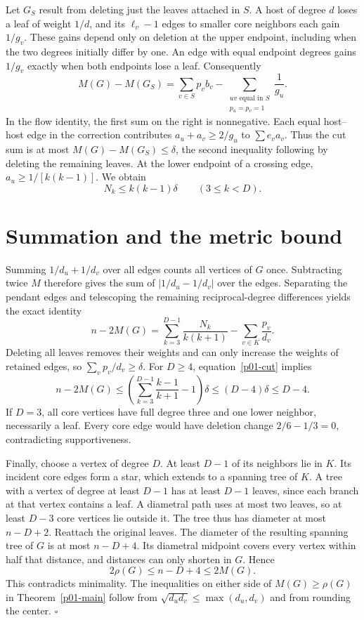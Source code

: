 \documentclass[11pt,a4paper]{article}
\begin{document}
Let $G_S$ result from deleting just the leaves attached in $S$.
A host of degree $d$ loses a leaf of weight $1/d$, and its
$\ell_v-1$ edges to smaller core neighbors each gain $1/g_v$.
These gains depend only on deletion at the upper endpoint, including
when the two degrees initially differ by one. An edge with equal
endpoint degrees gains $1/g_v$ exactly when both endpoints lose a leaf.
Consequently
\[
 M(G)-M(G_S)=\sum_{v\in S}p_v b_v-
 \sum_{\substack{uv\text{ equal in }S\\p_u=p_v=1}}\frac1{g_u}.
\]
In the flow identity, the first sum on the right is nonnegative. Each
equal host--host edge in the correction contributes $a_u+a_v\ge2/g_u$
to $\sum e_v a_v$. Thus the cut sum is at most $M(G)-M(G_S)\le\delta$,
the second inequality following by deleting the remaining leaves.
At the lower endpoint of a crossing edge, $a_u\ge1/[k(k-1)]$. We obtain
\begin{equation}\label{p01-cut}
 \boxed{N_k\le k(k-1)\delta\qquad(3\le k<D).}
\end{equation}

\section{Summation and the metric bound}
Summing $1/d_u+1/d_v$ over all edges counts all vertices of $G$ once.
Subtracting twice $M$ therefore gives the sum of $|1/d_u-1/d_v|$ over
the edges. Separating the pendant edges and telescoping the remaining
reciprocal-degree differences yields the exact identity
\[
 n-2M(G)=\sum_{k=3}^{D-1}\frac{N_k}{k(k+1)}
               -\sum_{v\in K}\frac{p_v}{d_v}.
\]
Deleting all leaves removes their weights and can only increase the
weights of retained edges, so $\sum_v p_v/d_v\ge\delta$.
For $D\ge4$, equation~\eqref{p01-cut} implies
\[
 n-2M(G)\le
 \left(\sum_{k=3}^{D-1}\frac{k-1}{k+1}-1\right)\delta
 \le (D-4)\delta\le D-4 .
\]
If $D=3$, all core vertices have full degree three and one lower
neighbor, necessarily a leaf. Every core edge would have deletion
change $2/6-1/3=0$, contradicting supportiveness.

Finally, choose a vertex of degree $D$. At least $D-1$ of its
neighbors lie in $K$. Its incident core edges form a star, which
extends to a spanning tree of $K$. A tree with a vertex of degree
at least $D-1$ has at least $D-1$ leaves, since each branch at that
vertex contains a leaf. A diametral path uses at most two leaves, so
at least $D-3$ core vertices lie outside it. The tree thus has diameter
at most $n-D+2$. Reattach the original leaves. The diameter of the
resulting spanning tree of $G$ is at most $n-D+4$. Its diametral
midpoint covers every vertex within half that distance, and distances
can only shorten in $G$. Hence
\[
 2\rho(G)\le n-D+4\le2M(G).
\]
This contradicts minimality. The inequalities on either side of
$M(G)\ge\rho(G)$ in Theorem~\ref{p01-main} follow from
$\sqrt{d_ud_v}\le\max(d_u,d_v)$ and from rounding the center.
\hfill$\square$
\end{document}
